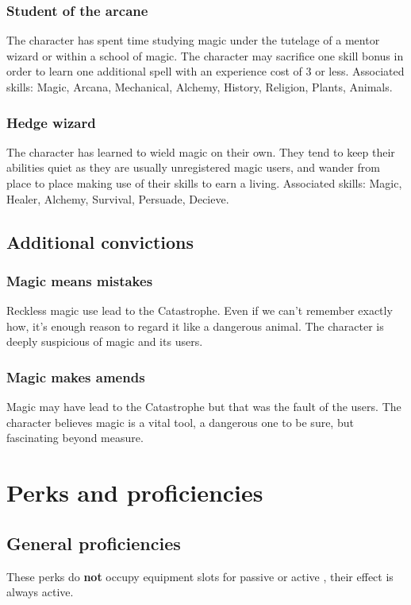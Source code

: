 \documentclass[a4paper,11pt,oneside]{book}
\newcommand{\textlf}[1]{\textbf{\titlecap{#1}}}
\begin{document}
\subsection{Student of the arcane}
The character has spent time studying magic under the tutelage of a mentor wizard or within a school of magic. The character may sacrifice one skill bonus in order to learn one additional spell with an experience cost of 3 or less. Associated skills: Magic, Arcana, Mechanical, Alchemy, History, Religion, Plants, Animals.

\subsection{Hedge wizard}
The character has learned to wield magic on their own. They tend to keep their abilities quiet as they are usually unregistered magic users, and wander from place to place making use of their skills to earn a living. Associated skills: Magic, Healer, Alchemy, Survival, Persuade, Decieve. 


\section{Additional convictions}


\subsection{Magic means mistakes}
Reckless magic use lead to the Catastrophe. Even if we can't remember exactly how, it's enough reason to regard it like a dangerous animal. The character is deeply suspicious of magic and its users.

\subsection{Magic makes amends}
Magic may have lead to the Catastrophe but that was the fault of the users. The character believes magic is a vital tool, a dangerous one to be sure, but fascinating beyond measure. 


\chapter{Perks and proficiencies}

\section{General proficiencies}
These perks do \textbf{not} occupy equipment slots for passive or active \textlf{perk}, their effect is always active.
\end{document}
